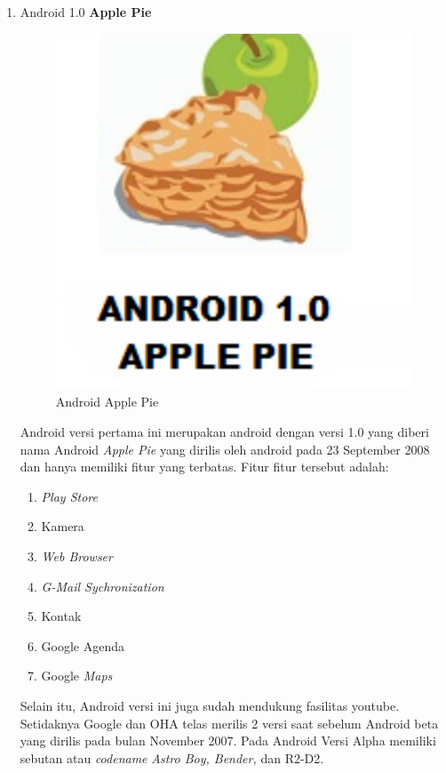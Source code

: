 \begin{enumerate}

\item Android 1.0 \textbf{Apple Pie}\\
\begin{figure}[!htbp]
    \centering
    \includegraphics[scale = 0.3]{pictures/asd.jpg}
    \caption{Android Apple Pie}
    \label{}
\end{figure}

Android versi pertama ini merupakan android dengan versi 1.0 yang diberi nama Android \textit{Apple Pie} yang dirilis oleh android  pada 23 September 2008 dan hanya memiliki fitur yang terbatas. Fitur fitur tersebut adalah:

\begin{enumerate}
    \item \textit{Play Store}
    \item Kamera
    \item \textit{Web Browser}
    \item \textit{G-Mail Sychronization}
    \item Kontak
    \item Google Agenda
    \item Google \textit{Maps}
\end{enumerate}
Selain itu, Android versi ini juga sudah mendukung fasilitas youtube. Setidaknya Google dan OHA telas merilis 2 versi saat sebelum Android beta yang dirilis pada bulan November 2007. Pada Android Versi Alpha memiliki sebutan atau \textit{codename} \textit{Astro Boy, Bender,} dan R2-D2.\\


\end{enumerate}
